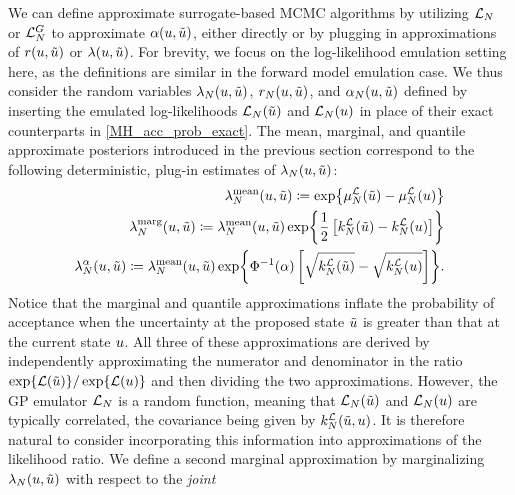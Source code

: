 \documentclass[12pt]{article}
\begin{document}
We can define approximate surrogate-based MCMC algorithms by utilizing $\llikEm[\Ndesign]$ 
or $\llikEmFwd[\Ndesign]$ to approximate $\accProbMH(\Par, \propPar)$, either directly or by plugging 
in approximations of $\accProbRatio(\Par, \propPar)$ or $\likRatio(\Par, \propPar)$.  
For brevity, we focus on the log-likelihood emulation setting here, as the definitions are similar in the forward 
model emulation case. 
We thus consider the random variables $\Em[\Ndesign]{\likRatio}(\Par, \propPar)$,
$\Em[\Ndesign]{\accProbRatio}(\Par, \propPar)$, and 
$\Em[\Ndesign]{\accProbMH}(\Par, \propPar)$ defined by inserting the emulated log-likelihoods 
$\llikEm[\Ndesign](\propPar)$ and $\llikEm[\Ndesign](\Par)$ in place of their exact counterparts
in \ref{MH_acc_prob_exact}. The mean, marginal, and quantile approximate posteriors introduced in the previous 
section correspond to the following deterministic, plug-in estimates of $\Em[\Ndesign]{\likRatio}(\Par, \propPar)$:
\begin{align}
\llikEmMean[\Ndesign]{\likRatio}(\Par, \propPar) 
\coloneqq \Exp{\emMean[\Ndesign]{\llik}(\propPar) - \emMean[\Ndesign]{\llik}(\Par)} \\
\llikEmMarg[\Ndesign]{\likRatio}(\Par, \propPar) 
\Def \llikEmMean[\Ndesign]{\likRatio}(\Par, \propPar) 
\Exp{\frac{1}{2}\left[\emKer[\Ndesign]{\llik}(\propPar) - \emKer[\Ndesign]{\llik}(\Par)\right]} \\
\llikEmQ[\Ndesign]{\likRatio}(\Par, \propPar) 
\Def \llikEmMean[\Ndesign]{\likRatio}(\Par, \propPar) 
\Exp{\GaussianCDF^{-1}(\quantileProb)  \left[\sqrt{\emKer[\Ndesign]{\llik}(\propPar)} - \sqrt{\emKer[\Ndesign]{\llik}(\Par)}\right]}.
\end{align}
Notice that the marginal and quantile approximations inflate the probability of acceptance when the 
uncertainty at the proposed state $\propPar$ is greater than that at the current state $\Par$.
All three of these approximations are derived by independently approximating the numerator and denominator 
in the ratio $\Exp{\llik(\propPar)} / \Exp{\llik(\Par)}$ and then dividing the two approximations.
However, the GP emulator $\llikEm[\Ndesign]$ is a random function, meaning that 
$\llikEm[\Ndesign](\propPar)$ and $\llikEm[\Ndesign](\Par)$ are typically correlated, the covariance
being given by $\emKer[\Ndesign]{\llik}(\propPar, \Par)$. It is therefore natural to consider incorporating 
this information into approximations of the likelihood ratio. We define a second marginal approximation 
by marginalizing $\Em[\Ndesign]{\likRatio}(\Par, \propPar)$ with respect to the \textit{joint} 
\end{document}
